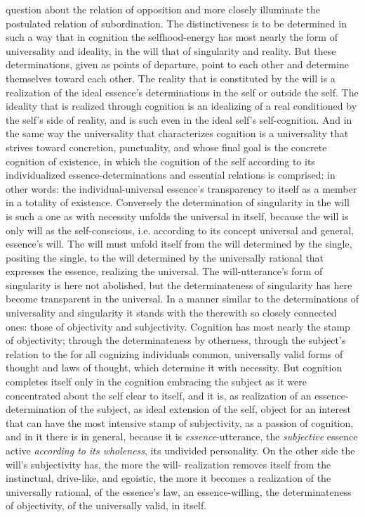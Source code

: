 \documentclass[12pt,a4paper]{book}
\begin{document}
question about the relation of opposition and more closely illuminate the postulated relation
of subordination. The distinctiveness is to be determined in such a way that in cognition the
selfhood-energy has most nearly the form of universality and ideality, in the will that of
singularity and reality. But these determinations, given as points of departure, point to
each other and determine themselves toward each other. The reality that is constituted by the
will is a realization of the ideal essence's determinations in the self or outside the self.
The ideality that is realized through cognition is an idealizing of a real conditioned by the
self's side of reality, and is such even in the ideal self's self-cognition. And in the same
way the universality that characterizes cognition is a universality that strives toward
concretion, punctuality, and whose final goal is the concrete cognition of existence, in
which the cognition of the self according to its individualized essence-determinations and
essential relations is comprised; in other words: the individual-universal essence's
transparency to itself as a member in a totality of existence. Conversely the determination of
singularity in the will is such a one as with necessity unfolds the universal in itself,
because the will is only will as the self-conscious, i.e. according to its concept universal
and general, essence's will. The will must unfold itself from the will determined by the
single, positing the single, to the will determined by the universally rational that expresses
the essence, realizing the universal. The will-utterance's form of singularity is here not
abolished, but the determinateness of singularity has here become transparent in the universal.
In a manner similar to the determinations of universality and singularity it stands with the
therewith so closely connected ones: those of objectivity and subjectivity. Cognition has most
nearly the stamp of objectivity; through the determinateness by otherness, through the
subject's relation to the for all cognizing individuals common, universally valid forms of
thought and laws of thought, which determine it with necessity. But cognition completes itself
only in the cognition embracing the subject as it were concentrated about the self clear to
itself, and it is, as realization of an essence-determination of the subject, as ideal
extension of the self, object for an interest that can have the most intensive stamp of
subjectivity, as a passion of cognition, and in it there is in general, because it is
\emph{essence}-utterance, the \emph{subjective} essence active \emph{according to its wholeness}, its
undivided personality. On the other side the will's subjectivity has, the more the will-
realization removes itself from the instinctual, drive-like, and egoistic, the more it becomes
a realization of the universally rational, of the essence's law, an essence-willing, the
determinateness of objectivity, of the universally valid, in itself.
\end{document}
